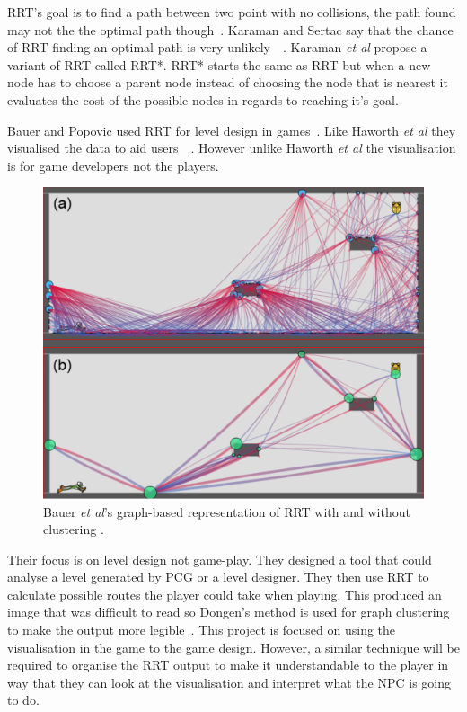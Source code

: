 \documentclass[journal]{IEEEtran}
\begin{document}
RRT's goal is to find a path between two point with no collisions, the path found may not the the optimal path though~\cite{Kuffner2000, Karaman2011}.  Karaman and Sertac say that the chance of RRT finding an optimal path is very unlikely~\cite{karaman2010}~\cite{Tremblay2014}.  Karaman \textit{et al} propose a variant of RRT called RRT*. RRT* starts the same as RRT but when a new node has to choose a parent node instead of choosing the node that is nearest it evaluates the cost of the possible nodes in regards to reaching it's goal.

Bauer and Popovic used RRT for level design in games~\cite{bauer2012}. Like Haworth \textit{et al} they visualised the data to aid users~\cite{bauer2012}~\cite{Haworth2010}. However unlike Haworth \textit{et al} the visualisation is for game developers not the players. 

\begin{figure}[h]
	\includegraphics[width=1.0\linewidth]{BauerRRT.png}
	\caption{ Bauer \textit{et al}'s graph-based representation of RRT with and without clustering \cite{bauer2012}.}
	\label{BauerRRT}
\end{figure} 

Their focus is on level design not game-play. They designed a tool that could analyse a level generated by PCG or a level designer. They then use RRT to calculate possible routes the player could take when playing. This produced an image that was difficult to read so Dongen's method is used for graph clustering to make the output more legible~\cite{bauer2012, van2001}.  This project is focused on using the visualisation in the game to the game design. However, a similar technique will be required to organise the RRT output to make it understandable to the player in way that they can look at the visualisation and interpret what the NPC is going to do. 
\end{document}
